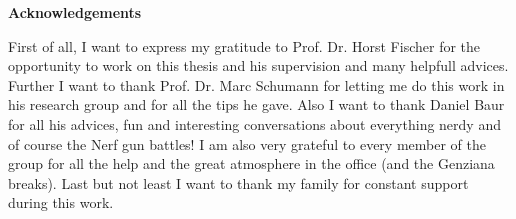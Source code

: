 {\Large\textbf{Acknowledgements}}

First of all, I want to express my gratitude to Prof. Dr. Horst Fischer for the opportunity to work on this thesis and his supervision and many helpfull advices.
Further I want to thank Prof. Dr. Marc Schumann for letting me do this work in his research group and for all the tips he gave.
Also I want to thank Daniel Baur for all his advices, fun and interesting conversations about everything nerdy and of course the Nerf gun battles!
I am also very grateful to every member of the group for all the help and the great atmosphere in the office (and the Genziana breaks).
Last but not least I want to thank my family for constant support during this work.
